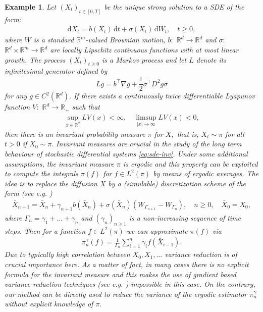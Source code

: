 \documentclass[bj]{imsart}
\def\rmd{\mathrm{d}}
\newtheorem{example}{Example}
\begin{document}
\begin{example}
  Let \((X_t)_{t\in [0,T]}\) be the unique strong solution to a  SDE of the form:
\begin{eqnarray}
\label{eq:sde-inv}
\rmd X_t=b(X_t)\, \rmd t+\sigma(X_t)\, \rmd W_t,\quad t\geq 0,	
\end{eqnarray}
where \(W\) is a standard \(\mathbb{R}^m\)-valued Brownian motion, \(b:\) \(\mathbb{R}^d\to \mathbb{R}^d\) and \(\sigma:\) \(\mathbb{R}^d\times \mathbb{R}^m \to \mathbb{R}^d\) are locally Lipschitz continuous functions with at most linear growth.
The process \((X_t)_{t\geq 0}\) is a Markov
process and let \(L\) denote its infinitesimal generator defined by
\begin{equation*}
Lg=b^\top \nabla g+\frac{1}{2}\sigma^\top D^2g\sigma
\end{equation*}
for any \(g\in C^2(\mathbb{R}^d).\)
If there exists a continuously twice differentiable Lyapunov function \(V:\) \(\mathbb{R}^d\to \mathbb{R}_{+}\) such that
\begin{eqnarray*}
\sup_{x\in \mathbb{R}^d} LV(x) <\infty,\quad \limsup_{|x|\to \infty} LV(x)<0,
\end{eqnarray*}
then there is an invariant probability measure \(\pi\)  for \(X,\) that is, \(X_t\sim \pi\) for all \(t> 0\) if \(X_0\sim \pi.\) Invariant measures are crucial in the study of the long term behaviour of stochastic differential
systems \eqref{eq:sde-inv}.    Under some additional assumptions,  the invariant
measure \(\pi\) is  ergodic and this property
can be exploited  to compute  the integrals \(\pi(f)\) for \(f\in L^2(\pi)\) by means of ergodic averages. The idea is to replace the diffusion \(X\) by a (simulable) discretization scheme of the form (see e.g. \cite{MR3861816})
\begin{eqnarray*}
\bar X_{n+1}=\bar X_n+\gamma_{n+1} b(\bar X_n)+\sigma(\bar X_n)(W_{\Gamma_{n+1}}-W_{\Gamma_n}), \quad n\geq 0,\quad \bar X_0=X_0,
\end{eqnarray*}
where \(\Gamma_n=\gamma_1+\ldots+\gamma_n\) and \((\gamma_n)_{n\geq 1}\) is a non-increasing sequence of time steps. Then for a function \(f\in L^2(\pi)\) we can approximate \(\pi(f)\) via
\begin{eqnarray*}
\pi_n^\gamma(f)=\frac{1}{\Gamma_n}\sum_{i=1}^n \gamma_{i}f(\bar X_{i-1}).
\end{eqnarray*}
Due to typically high correlation between \(X_0,X_1,\ldots\)  variance reduction is of crucial importance here.
As a matter of fact, in many cases there is no explicit formula for the invariant measure and this makes the use of gradient  based  variance reduction techniques (see e.g. \cite{mira2013zero}) impossible in this case.
On the contrary, our method can be directly used to reduce the variance of the ergodic estimator \(\pi_n^\gamma\) without explicit knowledge of \(\pi.\)
\end{example}
\end{document}
